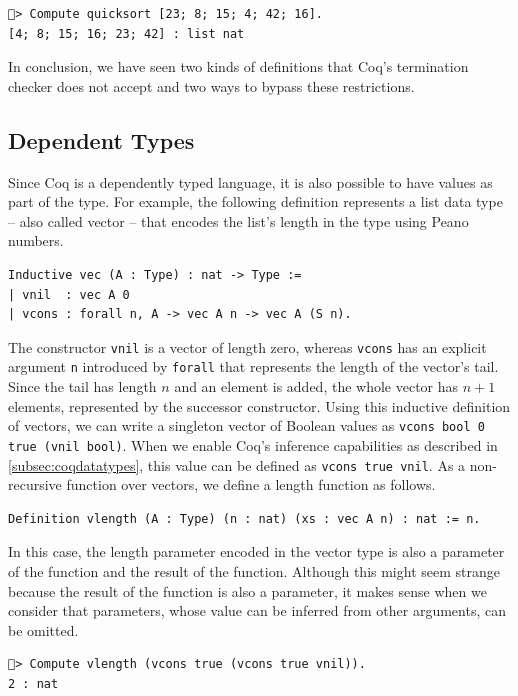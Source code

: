 \documentclass[a4paper, 11pt, fleqn, twoside, abstract=on]{scrreprt}
\newcommand{\cinl}[1]{\texttt{#1}}
\begin{document}
\begin{verbatim}
🐔> Compute quicksort [23; 8; 15; 4; 42; 16].
[4; 8; 15; 16; 23; 42] : list nat
\end{verbatim}

In conclusion, we have seen two kinds of definitions that Coq's termination checker does not accept and two ways to bypass these restrictions.

\subsection{Dependent Types}
\label{subsec:dependent}

Since Coq is a dependently typed language, it is also possible to have values as part of the type.
For example, the following definition represents a list data type -- also called vector -- that encodes the list's length in the type using Peano numbers.

\begin{verbatim}
Inductive vec (A : Type) : nat -> Type :=
| vnil  : vec A 0
| vcons : forall n, A -> vec A n -> vec A (S n).
\end{verbatim}

The constructor \cinl{vnil} is a vector of length zero, whereas \cinl{vcons} has an explicit argument \cinl{n} introduced by \cinl{forall} that represents the length of the vector's tail.
Since the tail has length $n$ and an element is added, the whole vector has $n + 1$ elements, represented by the successor constructor.
Using this inductive definition of vectors, we can write a singleton vector of Boolean values as \cinl{vcons bool 0 true (vnil bool)}.
When we enable Coq's inference capabilities as described in \autoref{subsec:coqdatatypes}, this value can be defined as \cinl{vcons true vnil}.
As a non-recursive function over vectors, we define a length function as follows.

\begin{verbatim}
Definition vlength (A : Type) (n : nat) (xs : vec A n) : nat := n.
\end{verbatim}

In this case, the length parameter encoded in the vector type is also a parameter of the function and the result of the function.
Although this might seem strange because the result of the function is also a parameter, it makes sense when we consider that parameters, whose value can be inferred from other arguments, can be omitted.

\begin{verbatim}
🐔> Compute vlength (vcons true (vcons true vnil)).
2 : nat
\end{verbatim}
\end{document}
